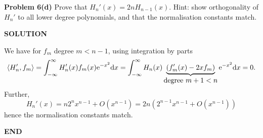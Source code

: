 \documentclass[12pt,a4paper]{article}
\begin{document}
\textbf{Problem 6(d)} Prove that $H_n'(x) = 2n H_{n-1}(x)$. Hint: show orthogonality of $H_n'$ to all lower degree polynomials, and that the normalisation constants match.

\textbf{SOLUTION}

We have for $f_m$ degree $m < n-1$, using integration by parts
\[
\ensuremath{\langle}H_n', f_m\ensuremath{\rangle} = \ensuremath{\int}_{-\ensuremath{\infty}}^\ensuremath{\infty} H_n'(x) f_m(x) {\rm e}^{-x^2} {\rm d} x =  \ensuremath{\int}_{-\ensuremath{\infty}}^\ensuremath{\infty} H_n(x) \underbrace{(f_m'(x) -2x f_m)}_{\hbox{degree $m+1 < n$}}  {\rm e}^{-x^2} {\rm d} x = 0.
\]
Further,
\[
H_n'(x) = n 2^n x^{n-1} + O(x^{n-1}) = 2n (2^{n-1} x^{n-1} + O(x^{n-1}))
\]
hence the normalisation constants match.

\textbf{END}
\end{document}
